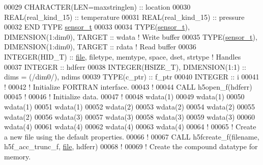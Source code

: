 \begin{DoxyCode}
00029      \textcolor{keywordtype}{CHARACTER(LEN=maxstringlen)} :: location
00030      \textcolor{keywordtype}{REAL(real\_kind\_15)} :: temperature
00031      \textcolor{keywordtype}{REAL(real\_kind\_15)} :: pressure
00032 \textcolor{keyword}{  END TYPE }\hyperlink{structsensor__t}{sensor\_t}
00033 
00034   \textcolor{keywordtype}{TYPE}(\hyperlink{structsensor__t}{sensor\_t}), \textcolor{keywordtype}{DIMENSION(1:dim0)}, \textcolor{keywordtype}{TARGET} ::  wdata \textcolor{comment}{! Write buffer}
00035   \textcolor{keywordtype}{TYPE}(\hyperlink{structsensor__t}{sensor\_t}), \textcolor{keywordtype}{DIMENSION(1:dim0)}, \textcolor{keywordtype}{TARGET} ::  rdata \textcolor{comment}{! Read buffer}
00036   \textcolor{keywordtype}{INTEGER(HID\_T)}  :: \hyperlink{structfile}{file}, filetype, memtype, space, dset, strtype \textcolor{comment}{! Handles}
00037   \textcolor{keywordtype}{INTEGER} :: hdferr
00038   \textcolor{keywordtype}{INTEGER(HSIZE\_T)}, \textcolor{keywordtype}{DIMENSION(1:1)}   :: dims = (/dim0/), ndims
00039   \textcolor{keywordtype}{TYPE}(c\_ptr) :: f\_ptr
00040   \textcolor{keywordtype}{INTEGER} :: i
00041   \textcolor{comment}{!}
00042   \textcolor{comment}{! Initialize FORTRAN interface.}
00043   \textcolor{comment}{!}
00044   \textcolor{keyword}{CALL }h5open\_f(hdferr)
00045   \textcolor{comment}{!}
00046   \textcolor{comment}{! Initialize data.}
00047   \textcolor{comment}{!}
00048   wdata(1)%
00049   wdata(1)%
00050   wdata(1)%
00051   wdata(1)%
00052   wdata(2)%
00053   wdata(2)%
00054   wdata(2)%
00055   wdata(2)%
00056   wdata(3)%
00057   wdata(3)%
00058   wdata(3)%
00059   wdata(3)%
00060   wdata(4)%
00061   wdata(4)%
00062   wdata(4)%
00063   wdata(4)%
00064   \textcolor{comment}{!}
00065   \textcolor{comment}{! Create a new file using the default properties.}
00066   \textcolor{comment}{!}
00067   \textcolor{keyword}{CALL }h5fcreate\_f(filename, h5f\_acc\_trunc\_f, \hyperlink{structfile}{file}, hdferr)
00068   \textcolor{comment}{!}
00069   \textcolor{comment}{! Create the compound datatype for memory.}

\end{DoxyCode}
